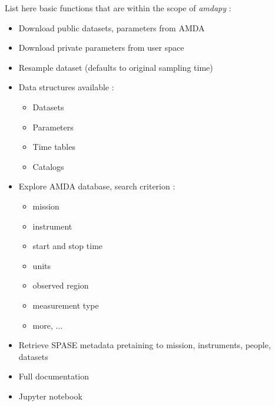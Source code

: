 \documentclass[a4paper,11pt]{report}
\begin{document}
List here basic functions that are within the scope of \emph{amdapy} : 
\begin{itemize}
	\item Download public datasets, parameters from AMDA
	\item Download private parameters from user space
	\item Resample dataset (defaults to original sampling time)
	\item Data structures available : 
	\begin{itemize}
		\item Datasets
		\item Parameters
		\item Time tables
		\item Catalogs
	\end{itemize}
	\item Explore AMDA database, search criterion : 
		\begin{itemize}
			\item mission
			\item instrument
			\item start and stop time
			\item units
			\item observed region
			\item measurement type
			\item more, ...
		\end{itemize}
	\item Retrieve SPASE metadata pretaining to mission, instruments, people, datasets
	\item Full documentation
	\item Jupyter notebook
\end{itemize}

\newpage
\end{document}
